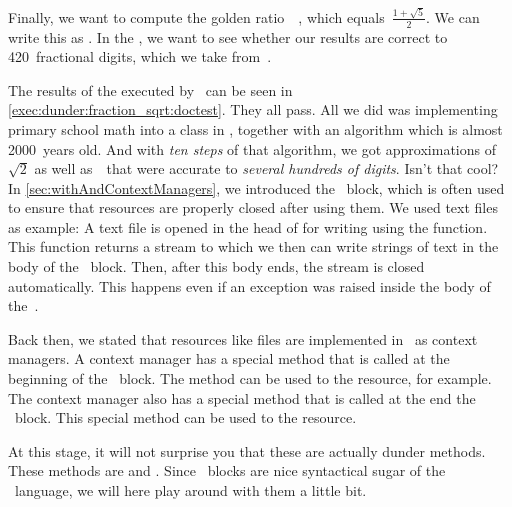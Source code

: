 Finally, we want to compute the golden ratio~\numberGoldenRatio~\cite{CEOEB2024GR,EHF2008EEOGTGOJLH11FEEEELIEILHIATBG11EAPWMETBFR,S2024DEOGRPOT}, which equals~$\frac{1+\sqrt{5}}{2}$.
We can write this as .
In the , we want to see whether our results are correct to 420~fractional digits, which we take from~\cite{F1996TGR1T2P}.

The results of the  executed by \pytest\ can be seen in \cref{exec:dunder:fraction_sqrt:doctest}.
They all pass.
All we did was implementing primary school math into a class in \python, together with an algorithm which is almost 2000~years old.
And with \emph{ten steps} of that algorithm, we got approximations of~$\sqrt{2}$ as well as~\numberGoldenRatio\ that were accurate to \emph{several hundreds of digits}.
Isn't that cool?%
%
\FloatBarrier%
\endhsection%
%
%
\label{sec:dunder:contextManager}%
%
In \cref{sec:withAndContextManagers}, we introduced the ~block, which is often used to ensure that resources are properly closed after using them.
We used text files as example:
A text file is opened in the head of  for writing using the  function.
This function returns a stream to which we then can write strings of text in the body of the ~block.
Then, after this body ends, the stream is closed automatically.
This happens even if an exception was raised inside the body of the~.

Back then, we stated that resources like files are implemented in \python\ as context managers.
A context manager has a special method that is called at the beginning of the ~block.
The method can be used to  the resource, for example.
The context manager also has a special method that is called at the end the ~block.
This special method can be used to  the resource.

At this stage, it will not surprise you that these  are actually dunder methods.
These methods are  and .
Since ~blocks are nice syntactical sugar of the \python\ language, we will here play around with them a little bit.

